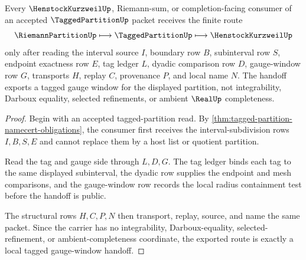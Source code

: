 \begin{theorem}
\label{thm:tagged-partition-gauge-window-handoff}
Every $\HenstockKurzweilUp$, Riemann-sum, or completion-facing consumer of an accepted $\TaggedPartitionUp$ packet receives the finite route
$$
\RiemannPartitionUp \longmapsto \TaggedPartitionUp \longmapsto \HenstockKurzweilUp
$$
only after reading the interval source $I$, boundary row $B$, subinterval row $S$, endpoint exactness row $E$, tag ledger $L$, dyadic comparison row $D$, gauge-window row $G$, transports $H$, replay $C$, provenance $P$, and local name $N$. The handoff exports a tagged gauge window for the displayed partition, not integrability, Darboux equality, selected refinements, or ambient $\RealUp$ completeness.
\end{theorem}
\begin{proof}
Begin with an accepted tagged-partition read. By \autoref{thm:tagged-partition-namecert-obligations}, the consumer first receives the interval-subdivision rows $I,B,S,E$ and cannot replace them by a host list or quotient partition.

Read the tag and gauge side through $L,D,G$. The tag ledger binds each tag to the same displayed subinterval, the dyadic row supplies the endpoint and mesh comparisons, and the gauge-window row records the local radius containment test before the handoff is public.

The structural rows $H,C,P,N$ then transport, replay, source, and name the same packet. Since the carrier has no integrability, Darboux-equality, selected-refinement, or ambient-completeness coordinate, the exported route is exactly a local tagged gauge-window handoff.
\end{proof}


\begin{closurestatus}{\TaggedPartitionUp}
  \theoryclosure{\seedClosure}
  \formalstatus{\unformalizedV}
\end{closurestatus}
